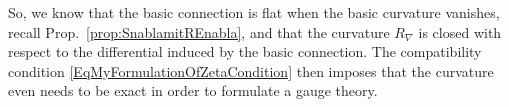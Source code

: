 So, we know that the basic connection is flat when the basic curvature vanishes, recall Prop.~\ref{prop:SnablamitREnabla}, and that the curvature $R_\nabla$ is closed with respect to the differential induced by the basic connection. The compatibility condition \ref{EqMyFormulationOfZetaCondition} then imposes that the curvature even needs to be exact in order to formulate a gauge theory.
%
%
%

